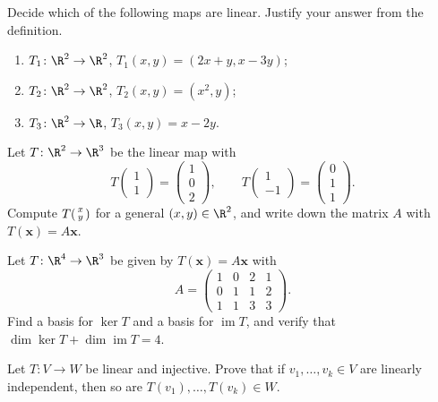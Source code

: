 
\begin{exercise}\label{ex:la-7}
Decide which of the following maps are linear. Justify your answer from the definition.
\begin{enumerate}[label=(\alph*)]
  \item $T_1\colon\R^2\to\R^2$, $T_1(x,y)=(2x+y,x-3y)$;
  \item $T_2\colon\R^2\to\R^2$, $T_2(x,y)=(x^2,y)$;
  \item $T_3\colon\R^2\to\R$, $T_3(x,y)=x-2y$.
\end{enumerate}
\end{exercise}

\begin{exercise}\label{ex:la-8}
Let $T\colon\R^2\to\R^3$ be the linear map with
\[
  T\begin{pmatrix}1\\1\end{pmatrix}
  =\begin{pmatrix}1\\0\\2\end{pmatrix},
  \qquad
  T\begin{pmatrix}1\\-1\end{pmatrix}
  =\begin{pmatrix}0\\1\\1\end{pmatrix}.
\]
Compute $T\begin{psmallmatrix}x\\y\end{psmallmatrix}$ for a general
$(x,y)\in\R^2$, and write down the matrix $A$ with $T(\mathbf{x})=A\mathbf{x}$.
\end{exercise}

\begin{exercise}\label{ex:la-9}
Let $T\colon\R^4\to\R^3$ be given by $T(\mathbf{x})=A\mathbf{x}$ with
\[
  A=\begin{pmatrix}1&0&2&1\\0&1&1&2\\1&1&3&3\end{pmatrix}.
\]
Find a basis for $\ker T$ and a basis for $\operatorname{im}T$, and verify
that $\dim\ker T+\dim\operatorname{im}T=4$.
\end{exercise}

\begin{exercise}\label{ex:la-10}
Let $T\colon V\to W$ be linear and injective. Prove that if
$v_1,\ldots,v_k\in V$ are linearly independent, then so are
$T(v_1),\ldots,T(v_k)\in W$.
\end{exercise}

